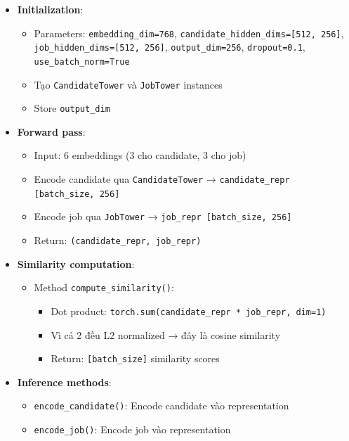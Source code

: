 \begin{itemize}
    \item \textbf{Initialization}:
    \begin{itemize}
        \item Parameters: \texttt{embedding\_dim=768}, \texttt{candidate\_hidden\_dims=[512, 256]}, \texttt{job\_hidden\_dims=[512, 256]}, \texttt{output\_dim=256}, \texttt{dropout=0.1}, \texttt{use\_batch\_norm=True}
        \item Tạo \texttt{CandidateTower} và \texttt{JobTower} instances
        \item Store \texttt{output\_dim}
    \end{itemize}
    
    \item \textbf{Forward pass}:
    \begin{itemize}
        \item Input: 6 embeddings (3 cho candidate, 3 cho job)
        \item Encode candidate qua \texttt{CandidateTower} → \texttt{candidate\_repr [batch\_size, 256]}
        \item Encode job qua \texttt{JobTower} → \texttt{job\_repr [batch\_size, 256]}
        \item Return: \texttt{(candidate\_repr, job\_repr)}
    \end{itemize}
    
    \item \textbf{Similarity computation}:
    \begin{itemize}
        \item Method \texttt{compute\_similarity()}: 
        \begin{itemize}
            \item Dot product: \texttt{torch.sum(candidate\_repr * job\_repr, dim=1)}
            \item Vì cả 2 đều L2 normalized → đây là cosine similarity
            \item Return: \texttt{[batch\_size]} similarity scores
        \end{itemize}
    \end{itemize}
    
    \item \textbf{Inference methods}:
    \begin{itemize}
        \item \texttt{encode\_candidate()}: Encode candidate vào representation
        \item \texttt{encode\_job()}: Encode job vào representation
    \end{itemize}
\end{itemize}

